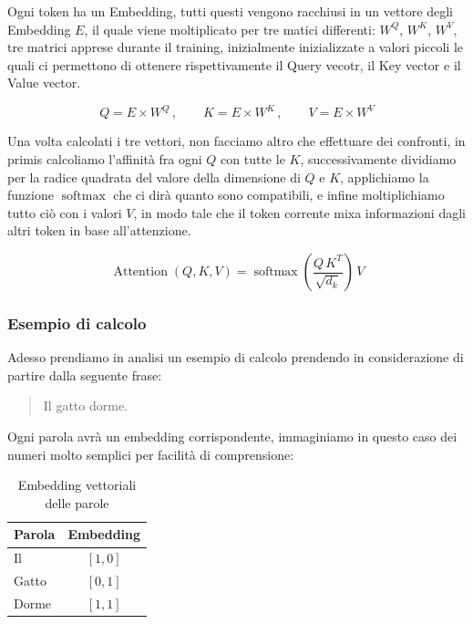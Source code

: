 Ogni token ha un Embedding, tutti questi vengono racchiusi in un vettore degli Embedding $E$, il quale viene moltiplicato per tre matici differenti: $W^Q$, $W^K$, $W^V$, tre matrici apprese durante il training, inizialmente inizializzate a valori piccoli le quali ci permettono di ottenere rispettivamente il Query vecotr, il Key vector e il Value vector.

\begin{equation}
    Q = E \times W^Q\,,\qquad K=E\times W^K\,,\qquad V=E\times W^V
\end{equation}

Una volta calcolati i tre vettori, non facciamo altro che effettuare dei confronti, in primis calcoliamo l'affinità fra ogni $Q$ con tutte le $K$, successivamente dividiamo per la radice quadrata del valore della dimensione di $Q$ e $K$, applichiamo la funzione $\operatorname{softmax}$ che ci dirà quanto sono compatibili, e infine moltiplichiamo tutto ciò con i valori $V$, in modo tale che il token corrente mixa informazioni dagli altri token in base all'attenzione.

\begin{equation}
    \operatorname{Attention}(Q,K,V) = \operatorname{softmax}\left(\frac{Q\,K^T}{\sqrt{d_k}}\right)\,V 
\end{equation}


\subsubsection{Esempio di calcolo}
Adesso prendiamo in analisi un esempio di calcolo prendendo in considerazione di partire dalla seguente frase:
\begin{quote}
    Il gatto dorme.
\end{quote}

Ogni parola avrà un embedding corrispondente, immaginiamo in questo caso dei numeri molto semplici per facilità di comprensione:

\begin{table}[h!]
    \centering
    \caption{Embedding vettoriali delle parole}
    \begin{tabular}{@{}lc@{}}
        \toprule
        \textbf{Parola} & \textbf{Embedding} \\
        \midrule
        Il     & $\left[1, 0\right]$ \\
        Gatto  & $\left[0, 1\right]$ \\
        Dorme  & $\left[1, 1\right]$ \\
        \bottomrule
    \end{tabular}
\end{table}

